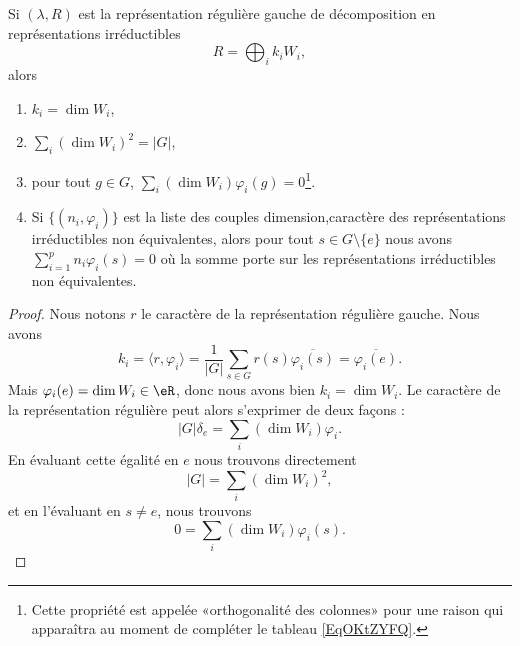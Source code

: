 \begin{proposition} \label{PropYLnxIjk}
    Si \( (\lambda,R)\) est la représentation régulière gauche de décomposition en représentations irréductibles
    \begin{equation}
        R=\bigoplus_ik_iW_i,
    \end{equation}
    alors
    \begin{enumerate}
        \item
            \( k_i=\dim W_i\),
        \item       \label{ITEMooLXIJooDxkGJh}
            \( \sum_i(\dim W_i)^2=|G|\),
        \item   \label{ItemEXAjTIh}
            pour tout \( g\in G\), \( \sum_i(\dim W_i)\varphi_i(g)=0\)\footnote{Cette propriété est appelée «orthogonalité des colonnes» pour une raison qui apparaîtra au moment de compléter le tableau \eqref{EqOKtZYFQ}.}.
        \item
            Si \( \{ (n_i,\varphi_i) \}\) est la liste des couples dimension,caractère des représentations irréductibles non équivalentes, alors pour tout \( s\in G\setminus\{ e \}\) nous avons \( \sum_{i=1}^pn_i\varphi_i(s)=0\) où la somme porte sur les représentations irréductibles non équivalentes.
    \end{enumerate}
\end{proposition}

\begin{proof}
    Nous notons \( r\) le caractère de la représentation régulière gauche. Nous avons
    \begin{equation}
        k_i=\langle r, \varphi_i\rangle =\frac{1}{ | G | }\sum_{s\in G}r(s)\overline{ \varphi_i(s) }=\overline{ \varphi_i(e) }.
    \end{equation}
    Mais \( \varphi_i(e)=\dim W_i\in \eR\), donc nous avons bien \( k_i=\dim W_i\). Le caractère de la représentation régulière peut alors s'exprimer de deux façons :
    \begin{equation}
        | G |\delta_e=\sum_i(\dim W_i)\varphi_i.
    \end{equation}
    En évaluant cette égalité en \( e\) nous trouvons directement
    \begin{equation}
        | G |=\sum_i(\dim W_i)^2,
    \end{equation}
    et en l'évaluant en \( s\neq e\), nous trouvons
    \begin{equation}
        0=\sum_i(\dim W_i)\varphi_i(s).
    \end{equation}
\end{proof}

